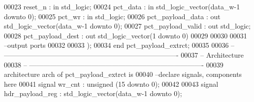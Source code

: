 \begin{DoxyCode}
00023         \textcolor{vhdlchar}{reset_n}             \textcolor{vhdlchar}{:} \textcolor{keywordflow}{in} \textcolor{comment}{std\_logic};
00024         \textcolor{vhdlchar}{pct_data}                \textcolor{vhdlchar}{:} \textcolor{keywordflow}{in} \textcolor{comment}{std\_logic\_vector}\textcolor{vhdlchar}{(}\textcolor{vhdlchar}{data_w}\textcolor{vhdlchar}{-}\textcolor{vhdllogic}{}\textcolor{vhdllogic}{1} \textcolor{keywordflow}{downto} \textcolor{vhdllogic}{}\textcolor{vhdllogic}{0}\textcolor{vhdlchar}{)};
00025         \textcolor{vhdlchar}{pct_wr}              \textcolor{vhdlchar}{:} \textcolor{keywordflow}{in} \textcolor{comment}{std\_logic};
00026         \textcolor{vhdlchar}{pct_payload_data}    \textcolor{vhdlchar}{:} \textcolor{keywordflow}{out} \textcolor{comment}{std\_logic\_vector}\textcolor{vhdlchar}{(}\textcolor{vhdlchar}{data_w}\textcolor{vhdlchar}{-}\textcolor{vhdllogic}{}\textcolor{vhdllogic}{1} \textcolor{keywordflow}{downto} \textcolor{vhdllogic}{}\textcolor{vhdllogic}{0}\textcolor{vhdlchar}{)};
00027         \textcolor{vhdlchar}{pct_payload_valid}   \textcolor{vhdlchar}{:} \textcolor{keywordflow}{out} \textcolor{comment}{std\_logic};
00028         \textcolor{vhdlchar}{pct_payload_dest}    \textcolor{vhdlchar}{:} \textcolor{keywordflow}{out} \textcolor{comment}{std\_logic\_vector}\textcolor{vhdlchar}{(}\textcolor{vhdllogic}{}\textcolor{vhdllogic}{1} \textcolor{keywordflow}{downto} \textcolor{vhdllogic}{}\textcolor{vhdllogic}{0}\textcolor{vhdlchar}{)}
00029     
00030 
00031 \textcolor{keyword}{      --output ports }
00032         
00033         \textcolor{vhdlchar}{)};
00034 \textcolor{keywordflow}{end} \textcolor{vhdlchar}{pct\_payload\_extrct};
00035 
00036 \textcolor{keyword}{-- ----------------------------------------------------------------------------}
00037 \textcolor{keyword}{-- Architecture}
00038 \textcolor{keyword}{-- ----------------------------------------------------------------------------}
00039 \textcolor{keywordflow}{architecture} arch \textcolor{keywordflow}{of} pct_payload_extrct is
00040 \textcolor{keyword}{--declare signals,  components here}
00041 \textcolor{keywordflow}{signal} \textcolor{vhdlchar}{wr_cnt} \textcolor{vhdlchar}{:} \textcolor{comment}{unsigned} \textcolor{vhdlchar}{(}\textcolor{vhdllogic}{}\textcolor{vhdllogic}{15} \textcolor{keywordflow}{downto} \textcolor{vhdllogic}{}\textcolor{vhdllogic}{0}\textcolor{vhdlchar}{)};
00042 
00043 \textcolor{keywordflow}{signal} \textcolor{vhdlchar}{hdr_payload_reg}  \textcolor{vhdlchar}{:} \textcolor{comment}{std\_logic\_vector}\textcolor{vhdlchar}{(}\textcolor{vhdlchar}{data_w}\textcolor{vhdlchar}{-}\textcolor{vhdllogic}{}\textcolor{vhdllogic}{1} \textcolor{keywordflow}{downto} \textcolor{vhdllogic}{}\textcolor{vhdllogic}{0}\textcolor{vhdlchar}{)};

\end{DoxyCode}

